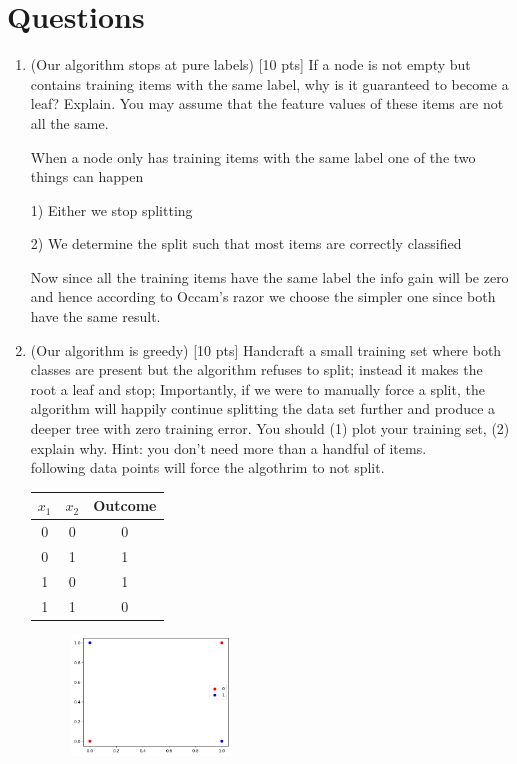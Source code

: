 \documentclass[a4paper]{article}
\theoremstyle{definition}
\begin{document}
\section{Questions}
\begin{enumerate}
\item (Our algorithm stops at pure labels) [10 pts] If a node is not empty but contains training items with the same label, why is it guaranteed to become a leaf?  Explain. You may assume that the feature values of these items are not all the same. 

When a node only has training items with the same label one of the two things can happen

1) Either we stop splitting

2) We determine the split such that most items are correctly classified

Now since all the training items have the same label the info gain will be zero and hence according to Occam's razor we choose the simpler one since both have the same result.\\



\item (Our algorithm is greedy)  [10 pts] Handcraft a small training set where both classes are present but the algorithm refuses to split; instead it makes the root a leaf and stop;
Importantly, if we were to manually force a split, the algorithm will happily continue splitting the data set further and produce a deeper tree with zero training error.
You should (1) plot your training set, (2) explain why.  Hint: you don't need more than a handful of items. \\


 following data points will force the algothrim to not split.

\begin{table}[h]
	\begin{tabular}{ccc}
		$x_1$ & $x_2$ & Outcome \\
		\hline
		0 & 0 & 0 \\
		0 & 1 & 1 \\
		1 & 0 & 1 \\
		1 & 1 & 0 \\
	\end{tabular}
\end{table}

	 \begin{figure}[h!]
	\centering
	\includegraphics[width=0.4\textwidth]{q2.png}  
	\captionsetup{labelformat=empty}
	\caption{}
	\label{fig:my_label}
\end{figure}


\end{enumerate}
\end{document}
